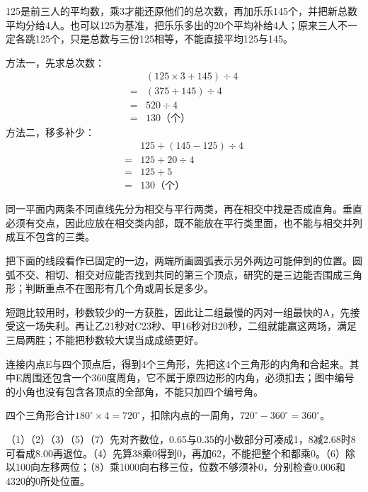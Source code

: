 \documentclass[multi=snippet,border=0pt]{standalone}
\newenvironment{snippet}[3]{\begin{minipage}{#1bp}\color{answerred}\fontsize{#2}{#3}\selectfont\raggedright}{\end{minipage}}
\begin{document}
\begin{snippet}{505}{11.5}{14}125是前三人的平均数，乘3才能还原他们的总次数，再加乐乐145个，并把新总数平均分给4人。也可以125为基准，把乐乐多出的20个平均补给4人；原来三人不一定各跳125个，只是总数与三份125相等，不能直接平均125与145。\par 方法一，先求总次数：\[\begin{aligned}&(125\times3+145)\div4\\={}&(375+145)\div4\\={}&520\div4\\={}&130\text{（个）}\end{aligned}\]方法二，移多补少：\[\begin{aligned}&125+(145-125)\div4\\={}&125+20\div4\\={}&125+5\\={}&130\text{（个）}\end{aligned}\]\end{snippet}
\begin{snippet}{505}{11.5}{14}同一平面内两条不同直线先分为相交与平行两类，再在相交中找是否成直角。垂直必须有交点，因此应放在相交类内部，既不能放在平行类里面，也不能与相交并列成互不包含的三类。\end{snippet}
\begin{snippet}{505}{11.5}{14}把下面的线段看作已固定的一边，两端所画圆弧表示另外两边可能伸到的位置。圆弧不交、相切、相交对应能否找到共同的第三个顶点，研究的是三边能否围成三角形；判断重点不在图形有几个角或周长是多少。\end{snippet}
\begin{snippet}{505}{11.5}{14}短跑比较用时，秒数较少的一方获胜，因此让二组最慢的丙对一组最快的A，先接受这一场失利。再让乙21秒对C23秒、甲16秒对B20秒，二组就能赢这两场，满足三局两胜；不能把秒数较大误当成成绩更好。\end{snippet}
\begin{snippet}{505}{11.5}{14}连接内点E与四个顶点后，得到4个三角形，先把这4个三角形的内角和合起来。其中E周围还包含一个360度周角，它不属于原四边形的内角，必须扣去；图中编号的小角也没有包含各顶点的全部角，不能只加四个编号角。\par 四个三角形合计\(180^\circ\times4=720^\circ\)，扣除内点的一周角，\(720^\circ-360^\circ=360^\circ\)。\end{snippet}
\begin{snippet}{505}{11.5}{14}（1）（2）（3）（5）（7）先对齐数位，0.65与0.35的小数部分可凑成1，8减2.68时8可看成8.00再退位。（4）先算38乘0得到0，再加62，不能把整个和都乘0。（6）除以100向左移两位；（8）乘1000向右移三位，位数不够须补0，分别检查0.006和4320的0所处位置。\end{snippet}
\end{document}
